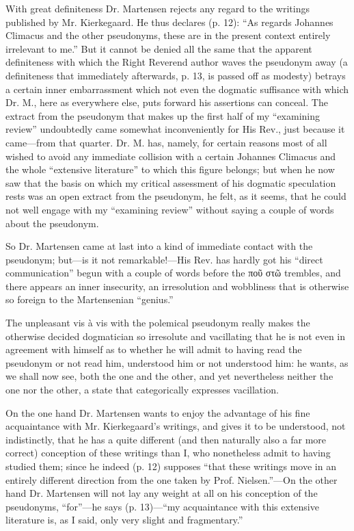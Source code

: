 \documentclass[12pt,a4paper,openany]{book}
\newcommand{\opage}[1]{\marginnote{\footnotesize\textit{[#1]}}}
\begin{document}
With great definiteness Dr. Martensen rejects any
regard to the writings published by Mr. Kierkegaard. He
thus declares (p. 12): ``As regards Johannes
Climacus and the other pseudonyms, these are in the present
context entirely irrelevant to me.'' But it
cannot be denied all the same that the apparent definiteness
with which the Right Reverend author waves the pseudonym
away (a definiteness that immediately afterwards, p. 13, is passed off
as modesty) betrays a certain inner embarrassment
which not even the dogmatic suffisance with which Dr. M.,
here as everywhere else, puts forward his assertions can conceal.
The extract from the pseudonym that makes up the first half
of my ``examining review'' undoubtedly came
somewhat inconveniently for His Rev., just because it came---from that
quarter. Dr. M. has, namely, for certain reasons most of all wished
\setcounter{footnote}{0}%
\opage{10}to avoid any immediate collision with a certain
Johannes Climacus and the whole ``extensive literature''
to which this figure belongs; but when he now saw that
the basis on which my critical assessment of his dogmatic
speculation rests was an open extract from the pseudonym,
he felt, as it seems, that he could not well
engage with my ``examining review'' without saying
a couple of words about the pseudonym.

So Dr. Martensen came at last into a kind of
immediate contact with the pseudonym; but---is it
not remarkable!---His Rev. has hardly got his ``direct
communication'' begun with a couple of words before the ποῦ στῶ
trembles, and there appears an inner insecurity, an irresolution
and wobbliness that is otherwise so foreign to the Martensenian
``genius.''

The unpleasant vis à vis with the polemical pseudonym
really makes the otherwise decided dogmatician so
irresolute and vacillating that he is not even in agreement with
himself as to whether he will admit to having read the pseudonym
or not read him, understood him or not understood
him: he wants, as we shall now see, both the one and the
other, and yet nevertheless neither the one nor the other,
a state that categorically expresses vacillation.

On the one hand Dr. Martensen wants to enjoy the advantage
of his fine acquaintance with Mr. Kierkegaard's writings,
and gives it to be understood, not indistinctly, that he has a quite
different (and then naturally also a far more correct) conception
of these writings than I, who nonetheless admit to having studied
them; since he indeed (p. 12) supposes ``that these writings
move in an entirely different direction from the one taken by Prof.
\setcounter{footnote}{0}%
\opage{11}Nielsen.''---On the other hand Dr. Martensen will
not lay any weight at all on his conception of the
pseudonyms, ``for''---he says (p. 13)---``my acquaintance
with this extensive literature is, as I said, only very
slight and fragmentary.''
\end{document}

